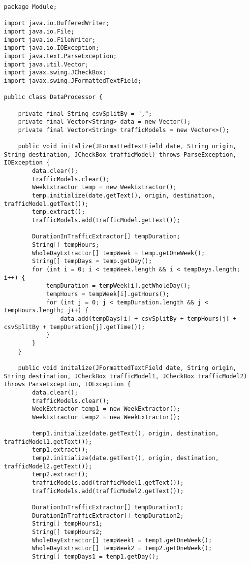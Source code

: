 \begin{lstlisting}[caption= DataProcessor.java]
package Module;

import java.io.BufferedWriter;
import java.io.File;
import java.io.FileWriter;
import java.io.IOException;
import java.text.ParseException;
import java.util.Vector;
import javax.swing.JCheckBox;
import javax.swing.JFormattedTextField;

public class DataProcessor {

    private final String csvSplitBy = ",";
    private final Vector<String> data = new Vector();
    private final Vector<String> trafficModels = new Vector<>();

    public void initalize(JFormattedTextField date, String origin, String destination, JCheckBox trafficModel) throws ParseException, IOException {
        data.clear();
        trafficModels.clear();
        WeekExtractor temp = new WeekExtractor();
        temp.initialize(date.getText(), origin, destination, trafficModel.getText());
        temp.extract();
        trafficModels.add(trafficModel.getText());

        DurationInTrafficExtractor[] tempDuration;
        String[] tempHours;
        WholeDayExtractor[] tempWeek = temp.getOneWeek();
        String[] tempDays = temp.getDay();
        for (int i = 0; i < tempWeek.length && i < tempDays.length; i++) {
            tempDuration = tempWeek[i].getWholeDay();
            tempHours = tempWeek[i].getHours();
            for (int j = 0; j < tempDuration.length && j < tempHours.length; j++) {
                data.add(tempDays[i] + csvSplitBy + tempHours[j] + csvSplitBy + tempDuration[j].getTime());
            }
        }
    }

    public void initalize(JFormattedTextField date, String origin, String destination, JCheckBox trafficModel1, JCheckBox trafficModel2) throws ParseException, IOException {
        data.clear();
        trafficModels.clear();
        WeekExtractor temp1 = new WeekExtractor();
        WeekExtractor temp2 = new WeekExtractor();

        temp1.initialize(date.getText(), origin, destination, trafficModel1.getText());
        temp1.extract();
        temp2.initialize(date.getText(), origin, destination, trafficModel2.getText());
        temp2.extract();
        trafficModels.add(trafficModel1.getText());
        trafficModels.add(trafficModel2.getText());

        DurationInTrafficExtractor[] tempDuration1;
        DurationInTrafficExtractor[] tempDuration2;
        String[] tempHours1;
        String[] tempHours2;
        WholeDayExtractor[] tempWeek1 = temp1.getOneWeek();
        WholeDayExtractor[] tempWeek2 = temp2.getOneWeek();
        String[] tempDays1 = temp1.getDay();


\end{lstlisting}
